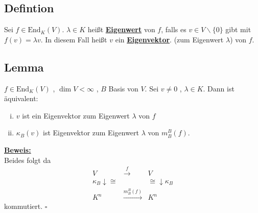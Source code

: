 \subsection{Defintion} %
\label{sub:defintion}
Sei $f \in \text{End}_K (V)$. $\lambda \in K$ heißt \underline{\textbf{Eigenwert}} von $f$, falls es $v \in V \backslash \{0\}$ gibt mit $f(v)= \lambda v$. In diesem Fall heißt $v$ ein \underline{\textbf{Eigenvektor}}. (zum Eigenwert $\lambda$) von $f$. 

\subsection{Lemma} %
\label{sub:lemma}
$f \in \text{End}_K (V)$ , $\dim V < \infty$ , $B$ Basis von $V$. Sei $v \not= 0$ , $\lambda \in K$. Dann ist äquivalent:
\begin{enumerate}[(i)]
	\item $v$ ist ein Eigenvektor zum Eigenwert $\lambda$ von $f$
	\item $\kappa_B(v)$ ist Eigenvektor zum Eigenwert $\lambda$ von $m_B^B(f)$.
\end{enumerate}
\underline{\textbf{Beweis:}} \\
Beides folgt da
\[
	\begin{matrix}
		V & \xrightarrow{f} & V \\
		\kappa_B \downarrow \cong & & \cong \downarrow \kappa_B \\
		K^n & \xrightarrow{m_B^B(f)} & K^n
	\end{matrix}
\]
kommutiert. \hfill \( \square \)

